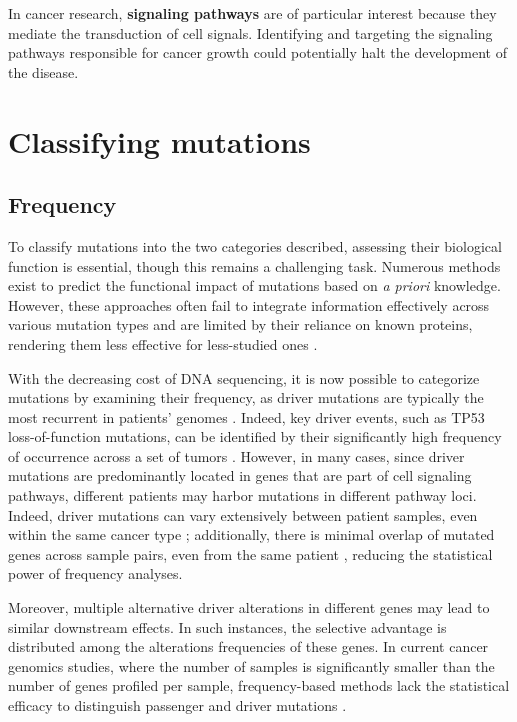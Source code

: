 In cancer research, \textbf{signaling pathways} are of particular interest because they mediate the transduction of cell signals. Identifying and targeting the signaling pathways responsible for cancer growth could potentially halt the development of the disease. 

\section{Classifying mutations}

\subsection{Frequency}

To classify mutations into the two categories described, assessing their biological function is essential, though this remains a challenging task. Numerous methods exist to predict the functional impact of mutations based on \textit{a priori} knowledge. However, these approaches often fail to integrate information effectively across various mutation types and are limited by their reliance on known proteins, rendering them less effective for less-studied ones \cite{multi-dendrix}.

With the decreasing cost of DNA sequencing, it is now possible to categorize mutations by examining their frequency, as driver mutations are typically the most recurrent in patients' genomes \cite{multi-dendrix}. Indeed, key driver events, such as TP53 loss-of-function mutations, can be identified by their significantly high frequency of occurrence across a set of tumors \cite{mutex}. However, in many cases, since driver mutations are predominantly located in genes that are part of cell signaling pathways, different patients may harbor mutations in different pathway loci. Indeed, driver mutations can vary extensively between patient samples, even within the same cancer type \cite{multi-dendrix}; additionally, there is minimal overlap of mutated genes across sample pairs, even from the same patient \cite{mdpfinder}, reducing the statistical power of frequency analyses.

Moreover, multiple alternative driver alterations in different genes may lead to similar downstream effects. In such instances, the selective advantage is distributed among the alterations frequencies of these genes. In current cancer genomics studies, where the number of samples is significantly smaller than the number of genes profiled per sample, frequency-based methods lack the statistical efficacy to distinguish passenger and driver mutations \cite{mutex}. 


